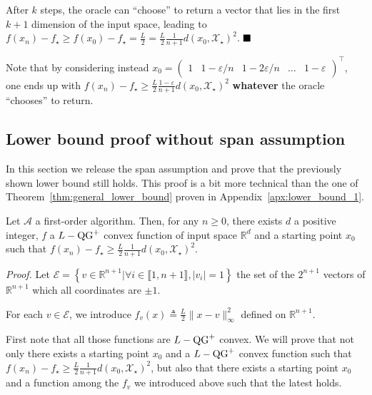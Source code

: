             After $k$ steps, the oracle can ``choose'' to return a vector that lies in the first $k+1$ dimension of the input space, leading to $f(x_n) - f_\star \geq f(x_0) - f_\star = \frac{L}{2} = \frac{L}{2}\frac{1}{n+1} d(x_0, \mathcal{X}_\star)^2$.
        $\hfill\blacksquare$

        \begin{Rem}
            Note that by considering instead $x_0 = \begin{pmatrix}
                1 & 1 - \varepsilon/n & 1 - 2\varepsilon/n & \ldots & 1 - \varepsilon
            \end{pmatrix}^\top$,
            one ends up with $f(x_n) - f_\star \geq \frac{L}{2}\frac{1 - \varepsilon}{n+1} d(x_0, \mathcal{X}_\star)^2$ \textbf{whatever} the oracle ``chooses'' to return.
        \end{Rem}

    \subsection{Lower bound proof without span assumption}
    \label{apx:lower_bound_2}

        In this section we release the span assumption and prove that the previously shown lower bound still holds.
        This proof is a bit more technical than the one of Theorem~\ref{thm:general_lower_bound} proven in Appendix~\ref{apx:lower_bound_1}.
        
        \begin{Th}
            Let $\mathcal{A}$ a first-order algorithm.
            Then, for any $n \geq 0$, there exists $d$ a positive integer, $f$ a $L-\operatorname{QG}^+$ convex function of input space $\mathbb{R}^d$ and a starting point $x_0$ such that $f(x_n) - f_\star \geq \frac{L}{2}\frac{1}{n+1} d(x_0, \mathcal{X}_\star)^2$.
        \end{Th}
        
        \noindent \textit{Proof.}
            Let $\mathcal{E} = \left\{ v \in \mathbb{R}^{n+1} | \forall i \in \llbracket 1, n+1 \rrbracket, |v_i| = 1 \right\}$ the set of the $2^{n+1}$ vectors of $\mathbb{R}^{n+1}$ which all coordinates are $\pm 1$.
            
            For each $v\in\mathcal{E}$, we introduce $f_v(x) \triangleq \frac{L}{2}\|x - v\|_\infty^2$ defined on $\mathbb{R}^{n+1}$.
            
            First note that all those functions are $L-\operatorname{QG}^+$ convex.
            We will prove that not only there exists a starting point $x_0$ and a $L-\operatorname{QG}^+$ convex function such that $f(x_n) - f_\star \geq \frac{L}{2}\frac{1}{n+1} d(x_0, \mathcal{X}_\star)^2$, but also that there exists a starting point $x_0$ and a function among the $f_v$ we introduced above such that the latest holds.
            
